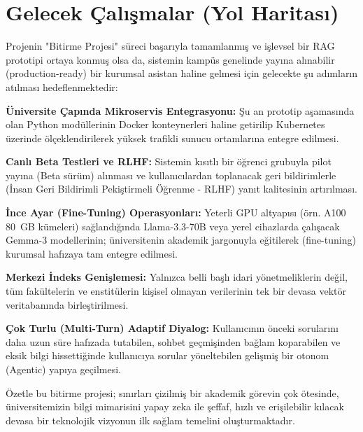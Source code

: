\documentclass[12pt,a4paper]{report}
\begin{document}
\section{Gelecek Çalışmalar (Yol Haritası)}
Projenin "Bitirme Projesi" süreci başarıyla tamamlanmış ve işlevsel bir RAG prototipi ortaya konmuş olsa da, sistemin kampüs genelinde yayına alınabilir (production-ready) bir kurumsal asistan haline gelmesi için gelecekte şu adımların atılması hedeflenmektedir:
\item \textbf{Üniversite Çapında Mikroservis Entegrasyonu:} Şu an prototip aşamasında olan Python modüllerinin Docker konteynerleri haline getirilip Kubernetes üzerinde ölçeklendirilerek yüksek trafikli sunucu ortamlarına entegre edilmesi.
    \item \textbf{Canlı Beta Testleri ve RLHF:} Sistemin kısıtlı bir öğrenci grubuyla pilot yayına (Beta sürüm) alınması ve kullanıcılardan toplanacak geri bildirimlerle (İnsan Geri Bildirimli Pekiştirmeli Öğrenme - RLHF) yanıt kalitesinin artırılması.
    \item \textbf{İnce Ayar (Fine-Tuning) Operasyonları:} Yeterli GPU altyapısı (örn. A100 80~GB kümeleri) sağlandığında Llama-3.3-70B veya yerel cihazlarda çalışacak Gemma-3 modellerinin; üniversitenin akademik jargonuyla eğitilerek (fine-tuning) kurumsal hafızaya tam entegre edilmesi.
    \item \textbf{Merkezi İndeks Genişlemesi:} Yalnızca belli başlı idari yönetmeliklerin değil, tüm fakültelerin ve enstitülerin kişisel olmayan verilerinin tek bir devasa vektör veritabanında birleştirilmesi.
    \item \textbf{Çok Turlu (Multi-Turn) Adaptif Diyalog:} Kullanıcının önceki sorularını daha uzun süre hafızada tutabilen, sohbet geçmişinden bağlam koparabilen ve eksik bilgi hissettiğinde kullanıcıya sorular yöneltebilen gelişmiş bir otonom (Agentic) yapıya geçilmesi.

Özetle bu bitirme projesi; sınırları çizilmiş bir akademik görevin çok ötesinde, üniversitemizin bilgi mimarisini yapay zeka ile şeffaf, hızlı ve erişilebilir kılacak devasa bir teknolojik vizyonun ilk sağlam temelini oluşturmaktadır.

\cleardoublepage



\appendix
\end{document}
